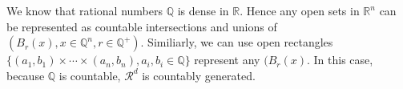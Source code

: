 \documentclass[en, normal, 11pt, black]{elegantnote}
\renewenvironment{proof}{\begin{tcolorbox}[colback=white, colframe=black!50, breakable, title=Proof. ]\setlength{\parskip}{0.8em}}{\\\rightline{$\square$}\end{tcolorbox}}
\begin{document}


    \begin{proof}
        We know that rational numbers $\mathbb{Q}$ is dense in $\mathbb{R}$. Hence any open sets in $\mathbb{R}^n$ can be represented as countable intersections and unions of $(B_r(x), x\in\mathbb{Q}^n, r\in\mathbb{Q}^+)$. Similiarly, we can use open rectangles $\{(a_1,b_1)\times\cdots\times(a_n,b_n), a_i, b_i\in\mathbb{Q}\}$ represent any $(B_r(x)$. In this case, because $\mathbb{Q}$ is countable, $\mathcal{R}^d$ is countably generated. 
    \end{proof}
\end{document}
